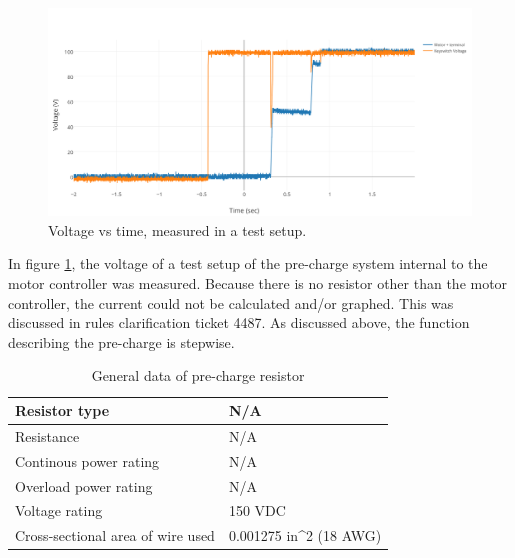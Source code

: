 \documentclass{article}
\begin{document}
            \begin{figure}[H]
                \centering
                \includegraphics[width = 0.8 \textwidth]{PrechargeVoltage}
                \caption{Voltage vs time, measured in a test setup. }
                \label{PCvoltage}
            \end{figure}

            In figure \ref{PCvoltage}, the voltage of a test setup of the pre-charge system internal to the motor controller was measured. Because there is no resistor other than the motor controller, the current could not be calculated and/or graphed. This was discussed in rules clarification ticket 4487. As discussed above, the function describing the pre-charge is stepwise.

            \begin{table}[H]
                \centering
                \begin{tabular}{|l|l|}
                \hline
                Resistor type & N/A \\ \hline
                Resistance & N/A \\ \hline
                Continous power rating & N/A \\ \hline
                Overload power rating & N/A \\ \hline
                Voltage rating & 150 VDC \\ \hline
                Cross-sectional area of wire used & 0.001275 in\textasciicircum 2 (18 AWG) \\ \hline
                \end{tabular}
                \caption{General data of pre-charge resistor }
                \label{prechargeresistor}
            \end{table}

\end{document}
